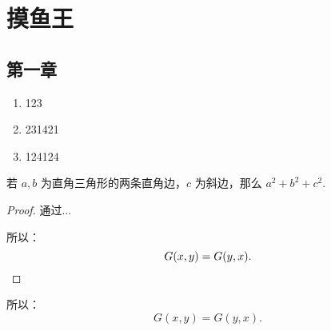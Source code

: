 \chapter{摸鱼王}

\section{第一章}

\begin{enumerate}
    \item 123
    \item 231421
    \item 124124
\end{enumerate}

\begin{theorem}[勾股定理]
    若 $a,b$ 为直角三角形的两条直角边，$c$ 为斜边，那么 $a^2 + b^2 + c^2.$
\end{theorem}

\begin{proof}
{
    通过...

    所以：
    \begin{equation*}
        G(x, y) = G(y, x).  \qedhere
    \end{equation*}
}
\end{proof}

\begin{proposition}
    所以：
    \begin{equation*}
        G(x, y) = G(y, x).
    \end{equation*}
\end{proposition}